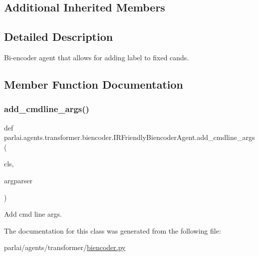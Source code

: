 \subsection*{Additional Inherited Members}


\subsection{Detailed Description}
\begin{DoxyVerb}Bi-encoder agent that allows for adding label to fixed cands.
\end{DoxyVerb}
 

\subsection{Member Function Documentation}
\mbox{\label{classparlai_1_1agents_1_1transformer_1_1biencoder_1_1IRFriendlyBiencoderAgent_a8ad3444ddd1002990ce5472fa1ec72bf}} 
\subsubsection{\texorpdfstring{add\+\_\+cmdline\+\_\+args()}{add\_cmdline\_args()}}
{\footnotesize\ttfamily def parlai.\+agents.\+transformer.\+biencoder.\+I\+R\+Friendly\+Biencoder\+Agent.\+add\+\_\+cmdline\+\_\+args (\begin{DoxyParamCaption}\item[{}]{cls,  }\item[{}]{argparser }\end{DoxyParamCaption})}

\begin{DoxyVerb}Add cmd line args.
\end{DoxyVerb}
 

The documentation for this class was generated from the following file\+:\begin{DoxyCompactItemize}
\item 
parlai/agents/transformer/\hyperlink{biencoder_8py}{biencoder.\+py}\end{DoxyCompactItemize}
